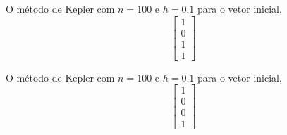 \documentclass[a4paper,12pt]{article}
\begin{document}



O m\'etodo de Kepler com $n = 100$ e $h = 0.1$ para o vetor inicial,
\[\left [ 
	\begin{array}{c}
		1 \\
		0 \\
		1 \\
		1
	\end{array}
\right ] 
\]
\begin{figure}[!h]
	\centering
\end{figure}
\newpage
O m\'etodo de Kepler com $n = 100$ e $h = 0.1$ para o vetor inicial,
\[\left [ 
	\begin{array}{c}
		1 \\
		0 \\
		0 \\
		1
	\end{array}
\right ] 
\]
\end{document}
